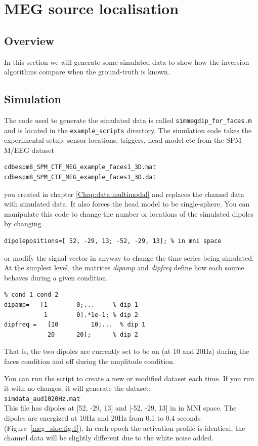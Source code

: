 \chapter{MEG source localisation\label{Chap:data:sloc}}

\section{Overview}
In this section we will generate some simulated data to show how the inversion algorithms compare when the ground-truth is known. 

\section{Simulation}
The code used to generate the simulated data is called \texttt{simmegdip\_for\_faces.m} and is located in the \texttt{example\_scripts} directory. The simulation code takes the experimental setup: sensor locations, triggers, head model etc from the SPM M/EEG dataset

\begin{verbatim}
cdbespm8_SPM_CTF_MEG_example_faces1_3D.mat
cdbespm8_SPM_CTF_MEG_example_faces1_3D.dat
\end{verbatim}

you created in chapter \ref{Chap:data:multimodal} and replaces the channel data with simulated data. It also forces the head model to be single-sphere.
You can manipulate this code to change the number or locations of the simulated dipoles by changing.

\begin{verbatim}
dipolepositions=[ 52, -29, 13; -52, -29, 13]; % in mni space
\end{verbatim}
or modify the signal vector in anyway to change the time series being simulated. At the simplest level, the matrices \textit{dipamp} and \textit{dipfreq} define how each source behaves during a given condition. 

\begin{verbatim}
% cond 1 cond 2
dipamp=	  [1 		0;...     % dip 1
           1 		0].*1e-1; % dip 2 
dipfreq =	[10 		10;... 	% dip 1
         	20 		20];      % dip 2
\end{verbatim}

That is, the two dipoles are currently set to be on (at 10 and 20Hz) during the faces condition and off during the amplitude condition.

You can run the script to create a new or modified dataset each time. If you run it with no changes, it will generate the dataset:
\\
\texttt{simdata\_aud1020Hz.mat}
\\
This file has dipoles at [52, -29, 13] and  [-52, -29, 13] in  in MNI space. The dipoles are energized at 10Hz and 20Hz from 0.1 to 0.4 seconds (Figure~\ref{meg_sloc:fig:1}). In each epoch the activation profile is identical, the channel data will be slightly different due to the white noise added.

